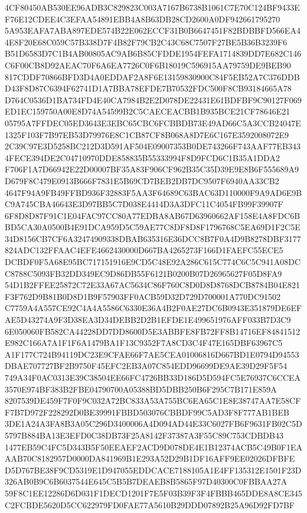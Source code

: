 \documentclass[UTF8,fontset=fandol,zihao=-4,a4paper]{ctexart}
\begin{document}
{{4CF80450AB530EE96ADB3C829823C003A7167B6738B1061C7E70C124BF9433EF76E12CDEE4C3EFAA54891EBB4A8B63DB28CD2600A0DF942661795270
5A953EAFA7ABA897EDE574B22E062ECCF31B0B6647451F82BDBBFD566EA44E8F20E68C059C57B338D7F4B82F79CB2C43C68C7507F27BE5B36B3239F6
B51D6583D7C1B4AB00805AC9AB6B85CFDDE1954FEFA1714839DD7E682C146C6F00CB8D92AEAC70F6A6EA7726C0F6B18019C596915AA79759DE9BEB90
817CDDF70866BFD3D4A0EDDAF2A8F6E13159830900C84F5EB52A7C376DDBD43F8D87C6394F62741D1A7BBA78EFDE7B70532FDC500F8CB93184665A78
D764C0536D1BA734FD4E40CA7984B2E2D078DE22431E61BDFBF9C90127F069ED1EC159750A00E8D74A54599B2C5CAECEACBB1B935BCE21CF78646E21
05795A7FFDEC05ED3643E3EBC65CBC6FCBBDB73E49AD66C5A3CCB24047E1325F103F7B97EB53D79976E8C1CB87CF8B068A8D7E6C167E3592008072E9
2C39C97E3D5258BC212D3D591AF504E09007353B0DE743266F743AAF77EB3434FECE394DE2C04710970DDE858835B55333994F8D9FCD6C1B35A1DDA2
F706F1A7D66942E22D00007BF35A83F906CF962B35C35D39E9E8B6F555689A9D679F8C479E0913B666F7831E5B69CD7BEB2DB7DC9507F6940AA33CB2
4647F94A9FB49FFBD936F32883F5AA3F64689C63BAC63D110000F9A9AD6E9BC9A745CBA46643E3D97BB5C7D038E4414D3A3DFC11C4054FB99F39907F
6F8D8D87F91C1E04FAC97CC80A77EDBA8AB67D63960662AF158E4A8FDC6BBD5CA30A0500B4E91DCA959D5C59AE77C8DF8D8F1796768C5EA69D1F2C5E
34D8156CB7CF6A32474909338DBAB635316E36DCC8B7F0A4D9B8278DBF3177824ADC132FFAAC4EFE4662430000D667BA4265273F166D1FAEFC55ECE5
DCBDF0F5A68E95BC717151916E9CD5C48E92A286C615C774C6C5C941A08DCC8788C5093FB32DD349EC9D86DB55F6121B0200B07D26965627F05D8FA9
54D1B2FFEE25872C72E33A67AC5634C86F760C8D0D8D8768DCB8784B04E821F3F762D9B81B0D8D1B9F57903FF0ACB59D32D729D700001A770DC91502
C7759A4A557CE92C4A4A5586C6330E36A4B2F0AE27DC6B0943E351879DE6EFAE5D43274A9F3D38EA3D34DEBB2D2B1EFDE1E499651976AFF033B7D3C9
6E050060FB582CA44228DD7DD8600D5E3ABBFE8FB72FF8B14716EF84841512E982C166A7A1F1F6A1479BA1F13C9352F7A8CD3C4F47E165DBF63967C5
A1F177C724B94119DC23E9CFAE66F7AE5CEA01006816D667BD1E0794D94553DBAE707727BF2B9750F45EFC2EB3A07C854EDD96699DE9AE39D29F5F54
749A34F0AC0313E39C38504EE66FC4726BB33D186D5D594FC5E76937C6CCEA3570E974BF383B2FBE04790700A05388BD5DBB250B6F295C7B171E859A
8207539DE459F7F0F9C032A72BC833A53A755BC6EA65C1E8E38747AA7E58CFF7B7D972F228292D0BE39991FBBD503076CBBDF99C5AD3F8F777AB1BEB
3DE1A24A3FA8B3A05C296D3400006A4D094AD44E33C6027FB6F9631FB02C5D5797B884BA13E3EFD0C38DB73F25A8142F37387A3F55C89C753CDBDB43
1477EB59C4FC5D343B5F50EEAEF2ACD9D078DE4E1B12374ACB5C49B0F1EAAAB70C8182957D0000DA841969B1E293A52D29B1DF16AFF9EE02026DFBFE
D5D767BE38F9CD5319E1D947055EDDCACE7188105A1E4FF135312E1501F23D326AB0B9C6B6037544E645C5B5B7DEAEB8B5865F97D40300C0FBBAA27A
59F8C1EE12286D6D031F1DECD1201F7E5F03B39F3F4FBBB465DDE8A8CE345C2FCBDE5620D5CC622979FD0FAE77A5610B29DDD07892B25A96D92FD7BF
}}
\end{document}
